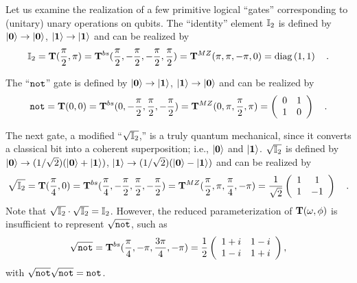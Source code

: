 \documentclass[12pt]{iopart}
\begin{document}
Let us examine the realization of a few primitive logical ``gates''
corresponding to (unitary) unary operations on qubits.
The ``identity'' element ${\Bbb I}_2$ is defined by
$\vert  {\bf 0}  \rangle  \rightarrow  \vert  {\bf 0}  \rangle $,
$\vert  {\bf 1}  \rangle  \rightarrow  \vert  {\bf 1}  \rangle $ and can be realized by
\begin{equation}
{\Bbb I}_2 =
{\bf T}({\pi \over 2},\pi)=
{\bf T}^{bs}({\pi \over 2},-{\pi \over 2},-{\pi \over 2},{\pi \over 2})=
{\bf T}^{MZ}(\pi ,\pi ,-\pi ,0)
={\rm diag}
\left( 1,1
\right)
\quad .
\end{equation}

The ``${\tt not}$'' gate is defined by
$\vert  {\bf 0}  \rangle  \rightarrow  \vert  {\bf 1}  \rangle $,
$\vert  {\bf 1}  \rangle  \rightarrow  \vert  {\bf 0}  \rangle $ and can be realized by
\begin{equation}
{\tt not} =
{\bf T}(0,0)=
{\bf T}^{bs}(0,-{\pi \over 2},{\pi \over 2},-{\pi \over 2})=
{\bf T}^{MZ}(0,\pi ,{\pi \over 2} ,\pi )
=
\left(
\begin{array}{cc}
0&1
\\
1&0
 \end{array}
\right)
\quad .
\end{equation}


The next gate, a modified ``$\sqrt{{\Bbb I}_2}$,'' is a truly quantum
mechanical, since it converts a classical bit
into
a coherent superposition; i.e., $\vert  {\bf 0}  \rangle $ and $\vert  {\bf 1}  \rangle $.
$\sqrt{{\Bbb I}_2}$ is defined by
$\vert  {\bf 0}  \rangle  \rightarrow  (1/\sqrt{2})(\vert  {\bf 0}  \rangle  + \vert  {\bf 1}  \rangle )$,
$\vert  {\bf 1}  \rangle  \rightarrow  (1/\sqrt{2})(\vert  {\bf 0}  \rangle  - \vert  {\bf 1}  \rangle )$ and can
be realized by
\begin{equation}
\sqrt{{\Bbb I}_2} =
{\bf T}({\pi \over 4},0)=
{\bf T}^{bs}({\pi \over 4},-{\pi \over 2},{\pi \over 2},-{\pi \over 2})=
{\bf T}^{MZ}({\pi \over 2},\pi ,{\pi \over 4} ,-\pi )
=
{1 \over \sqrt{2}}
\left(
\begin{array}{cc}
1&1
\\
1&-1
 \end{array}
\right)
\quad .
\end{equation}
Note that $\sqrt{{\Bbb I}_2}\cdot \sqrt{{\Bbb I}_2} = {\Bbb I}_2$.
However, the reduced parameterization of ${\bf T}(\omega,\phi)$
is insufficient to represent $\sqrt{{\tt not}}$, such as
\begin{equation}
\sqrt{{\tt not}} =
{\bf T}^{bs}({\pi \over 4},-\pi ,
{3\pi \over 4},
-\pi )=
{1 \over 2}
\left(
\begin{array}{cc}
1+i&1-i
\\
1-i&1+i
 \end{array}
\right)
,
\end{equation}
with
$
\sqrt{{\tt not}}
\sqrt{{\tt not}} = {\tt not}$.
\end{document}
